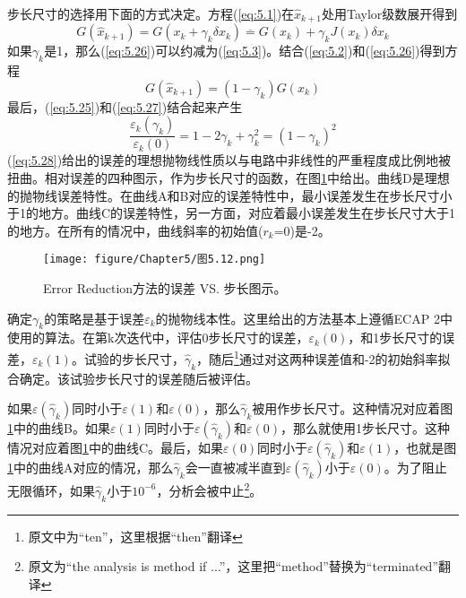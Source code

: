 步长尺寸的选择用下面的方式决定。方程(\ref{eq:5.1})在$\hat{x}_{k+1}$处用Taylor级数展开得到
\begin{equation}
    G(\hat{x}_{k+1}) = G(x_k + \gamma_k \delta x_k) \overline{=} G(x_k) + \gamma_k J(x_k) \delta x_k
    \label{eq:5.26}
\end{equation}
如果$\gamma_k$是1，那么(\ref{eq:5.26})可以约减为(\ref{eq:5.3})。结合(\ref{eq:5.2})和(\ref{eq:5.26})得到方程
\begin{equation}
    G(\hat{x}_{k+1}) = (1-\gamma_k)G(x_k)
    \label{eq:5.27}
\end{equation}
最后，(\ref{eq:5.25})和(\ref{eq:5.27})结合起来产生
\begin{equation}
    \frac{\varepsilon_k(\gamma_k)}{\varepsilon_k(0)} = 1 - 2\gamma_k + \gamma^2_k = (1-\gamma_k)^2
    \label{eq:5.28}
\end{equation}
(\ref{eq:5.28})给出的误差的理想抛物线性质以与电路中非线性的严重程度成比例地被扭曲。相对误差的四种图示，作为步长尺寸的函数，在图\ref{图5.12}中给出。曲线D是理想的抛物线误差特性。在曲线A和B对应的误差特性中，最小误差发生在步长尺寸小于1的地方。曲线C的误差特性，另一方面，对应着最小误差发生在步长尺寸大于1的地方。在所有的情况中，曲线斜率的初始值($r_k$=0)是-2\cite{ref-32}。
\begin{figure}[htbp]
\small
    \centering
    \texttt{[image: figure/Chapter5/图5.12.png]}
    \caption{Error Reduction方法的误差 VS. 步长图示。}
    \label{图5.12}
\end{figure}

确定$\gamma_k$的策略是基于误差$\varepsilon_k$的抛物线本性。这里给出的方法基本上遵循ECAP 2\cite{ref-32}中使用的算法。在第k次迭代中，评估0步长尺寸的误差，$\varepsilon_k(0)$，和1步长尺寸的误差，$\varepsilon_k(1)$。试验的步长尺寸，$\hat{\gamma}_k$，随后\footnote{原文中为“ten”，这里根据“then”翻译}通过对这两种误差值和-2的初始斜率拟合确定。该试验步长尺寸的误差随后被评估。

如果$\varepsilon(\hat{\gamma}_k)$同时小于$\varepsilon(1)$和$\varepsilon(0)$，那么$\hat{\gamma}_k$被用作步长尺寸。这种情况对应着图\ref{图5.12}中的曲线B。如果$\varepsilon(1)$同时小于$\varepsilon(\hat{\gamma}_k)$和$\varepsilon(0)$，那么就使用1步长尺寸。这种情况对应着图\ref{图5.12}中的曲线C。最后，如果$\varepsilon(0)$同时小于$\varepsilon(\hat{\gamma}_k)$和$\varepsilon(1)$，也就是图\ref{图5.12}中的曲线A对应的情况，那么$\hat{\gamma}_k$会一直被减半直到$\varepsilon(\hat{\gamma}_k)$小于$\varepsilon(0)$。为了阻止无限循环，如果$\hat{\gamma}_k$小于$10^{-6}$，分析会被中止\footnote{原文为“the analysis is method if ...”，这里把“method”替换为“terminated”翻译}。

